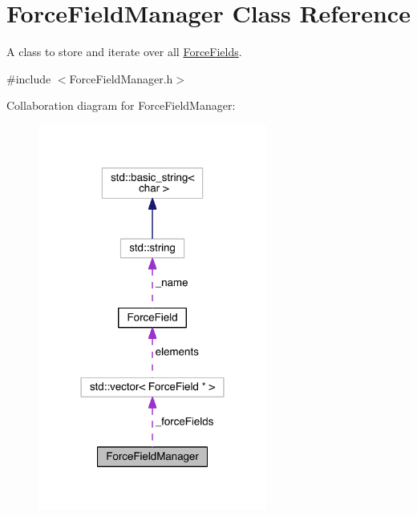 \hypertarget{classForceFieldManager}{\section{Force\+Field\+Manager Class Reference}
\label{classForceFieldManager}
}


A class to store and iterate over all \hyperlink{classForceField}{Force\+Fields}.  




{\ttfamily \#include $<$Force\+Field\+Manager.\+h$>$}



Collaboration diagram for Force\+Field\+Manager\+:\nopagebreak
\begin{figure}[H]
\begin{center}
\leavevmode
\includegraphics[width=213pt]{classForceFieldManager__coll__graph}
\end{center}
\end{figure}
